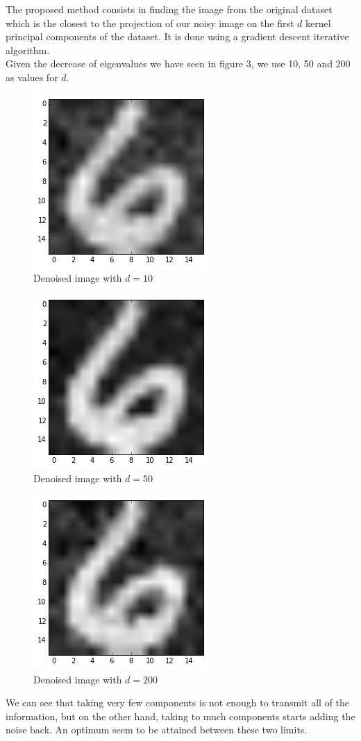 \documentclass[11pt,a4paper]{article}
\begin{document}
The proposed method consists in finding the image from the original dataset which is the closest to the projection of our noisy image on the first $d$ kernel principal components of the dataset. It is done using a gradient descent iterative algorithm.
\\Given the decrease of eigenvalues we have seen in figure 3, we use 10, 50 and 200 as values for $d$.
\begin{figure}[H]
	\centering
	\noindent\includegraphics[scale=0.7]{denoised_10.png}
	\caption{Denoised image with $d=10$}
\end{figure}
\begin{figure}[H]
	\centering
	\noindent\includegraphics[scale=0.7]{denoised_100.png}
	\caption{Denoised image with $d=50$}
\end{figure}
\begin{figure}[H]
	\centering
	\noindent\includegraphics[scale=0.7]{denoised_200.png}
	\caption{Denoised image with $d=200$}
\end{figure}
We can see that taking very few components is not enough to transmit all of the information, but on the other hand, taking to much components starts adding the noise back. An optimum seem to be attained between these two limits.
\end{document}
